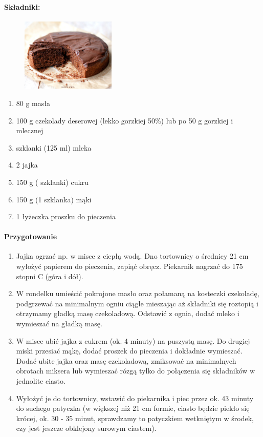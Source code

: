 \documentclass{article}
\begin{document}
    \paragraph{Składniki:}
    \begin{figure}
        \includegraphics[width=0.4\textwidth]{ciasto_czekoladowe.jpg}
    \end{figure}
    \begin{enumerate}
        \item 80 g masła
        \item 100 g czekolady deserowej (lekko gorzkiej 50\%) lub po 50 g
            gorzkiej i mlecznej
        \item {} szklanki (125 ml) mleka
        \item 2 jajka
        \item 150 g ( szklanki) cukru
        \item 150 g (1 szklanka) mąki
        \item 1 łyżeczka proszku do pieczenia
    \end{enumerate}

    \paragraph{Przygotowanie}
    \begin{enumerate}
        \item Jajka ogrzać np. w misce z ciepłą wodą. Dno tortownicy o średnicy
            21 cm wyłożyć papierem do pieczenia, zapiąć obręcz. Piekarnik
            nagrzać do 175 stopni C (góra i dół).
        \item W rondelku umieścić pokrojone masło oraz połamaną na kosteczki
            czekoladę, podgrzewać na minimalnym ogniu ciągle mieszając aż
            składniki się roztopią i otrzymamy gładką masę czekoladową. Odstawić
            z ognia, dodać mleko i wymieszać na gładką masę.
        \item W misce ubić jajka z cukrem (ok. 4 minuty) na puszystą masę. Do
            drugiej miski przesiać mąkę, dodać proszek do pieczenia i dokładnie
            wymieszać. Dodać ubite jajka oraz masę czekoladową, zmiksować na
            minimalnych obrotach miksera lub wymieszać rózgą tylko do połączenia
            się składników w jednolite ciasto.
        \item Wyłożyć je do tortownicy, wstawić do piekarnika i piec przez ok.
            43 minuty do suchego patyczka (w większej niż 21 cm formie, ciasto
            będzie piekło się krócej, ok. 30 - 35 minut, sprawdzamy to
            patyczkiem wetkniętym w środek, czy jest jeszcze obklejony surowym
            ciastem).
    \end{enumerate}
    \newpage
\end{document}
